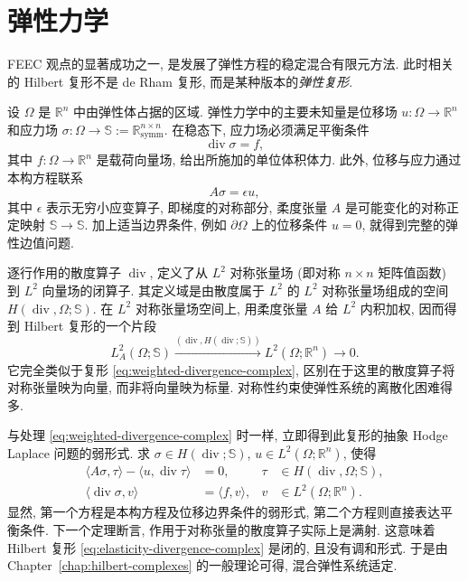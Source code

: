 \section{{弹性力学}}\label{sec:elasticity}

{FEEC 观点的显著成功之一, 是发展了弹性方程的稳定混合有限元方法. 此时相关的 Hilbert 复形不是 de Rham 复形, 而是某种版本的\emph{弹性复形}.}

{设 $\Omega$ 是 $\mathbb R^n$ 中由弹性体占据的区域. 弹性力学中的主要未知量是位移场 $u:\Omega\to\mathbb R^n$ 和应力场 $\sigma:\Omega\to\mathbb S:=\mathbb R_{\mathrm{symm}}^{n\times n}$. 在稳态下, 应力场必须满足平衡条件}
\[
\operatorname{div}\sigma=f,
\]
{其中 $f:\Omega\to\mathbb R^n$ 是载荷向量场, 给出所施加的单位体积体力. 此外, 位移与应力通过本构方程联系}
\[
A\sigma=\epsilon u,
\]
{其中 $\epsilon$ 表示无穷小应变算子, 即梯度的对称部分, 柔度张量 $A$ 是可能变化的对称正定映射 $\mathbb S\to\mathbb S$. 加上适当边界条件, 例如 $\partial\Omega$ 上的位移条件 $u=0$, 就得到完整的弹性边值问题.}

{逐行作用的散度算子 $\operatorname{div}$, 定义了从 $L^2$ 对称张量场 (即对称 $n\times n$ 矩阵值函数) 到 $L^2$ 向量场的闭算子. 其定义域是由散度属于 $L^2$ 的 $L^2$ 对称张量场组成的空间 $H(\operatorname{div},\Omega;\mathbb S)$. 在 $L^2$ 对称张量场空间上, 用柔度张量 $A$ 给 $L^2$ 内积加权, 因而得到 Hilbert 复形的一个片段}
\begin{equation}\label{eq:elasticity-divergence-complex}
L_A^2(\Omega;\mathbb S)\xrightarrow{(\operatorname{div},H(\operatorname{div};\mathbb S))}L^2(\Omega;\mathbb R^n)\to0.
\end{equation}
{它完全类似于复形 \eqref{eq:weighted-divergence-complex}, 区别在于这里的散度算子将对称张量映为向量, 而非将向量映为标量. 对称性约束使弹性系统的离散化困难得多.}

{与处理 \eqref{eq:weighted-divergence-complex} 时一样, 立即得到此复形的抽象 Hodge Laplace 问题的弱形式. 求 $\sigma\in H(\operatorname{div};\mathbb S)$, $u\in L^2(\Omega;\mathbb R^n)$, 使得}
\[
\begin{aligned}\langle A\sigma,\tau\rangle-\langle u,\operatorname{div}\tau\rangle&=0,&\tau&\in H(\operatorname{div},\Omega;\mathbb S),\\\langle\operatorname{div}\sigma,v\rangle&=\langle f,v\rangle,&v&\in L^2(\Omega;\mathbb R^n).\end{aligned}
\]
{显然, 第一个方程是本构方程及位移边界条件的弱形式, 第二个方程则直接表达平衡条件. 下一个定理断言, 作用于对称张量的散度算子实际上是满射. 这意味着 Hilbert 复形 \eqref{eq:elasticity-divergence-complex} 是闭的, 且没有调和形式. 于是由 Chapter~\ref{chap:hilbert-complexes} 的一般理论可得, 混合弹性系统适定.}

